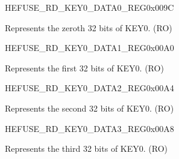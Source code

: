\begin{register}{H}{EFUSE\_RD\_KEY0\_DATA0\_REG}{0x009C}\label{regdesc:EFUSERDKEY0DATA0REG}
%
\regnewline%
\begin{regdesc}\begin{reglist}
\label{fielddesc:EFUSEKEY0DATA0}\item [EFUSE\_KEY0\_DATA0] Represents the zeroth 32 bits of KEY0. (RO)
\end{reglist}\end{regdesc}
\end{register}


\begin{register}{H}{EFUSE\_RD\_KEY0\_DATA1\_REG}{0x00A0}\label{regdesc:EFUSERDKEY0DATA1REG}
%
\regnewline%
\begin{regdesc}\begin{reglist}
\label{fielddesc:EFUSEKEY0DATA1}\item [EFUSE\_KEY0\_DATA1] Represents the first 32 bits of KEY0. (RO)
\end{reglist}\end{regdesc}
\end{register}


\begin{register}{H}{EFUSE\_RD\_KEY0\_DATA2\_REG}{0x00A4}\label{regdesc:EFUSERDKEY0DATA2REG}
%
\regnewline%
\begin{regdesc}\begin{reglist}
\label{fielddesc:EFUSEKEY0DATA2}\item [EFUSE\_KEY0\_DATA2] Represents the second 32 bits of KEY0. (RO)
\end{reglist}\end{regdesc}
\end{register}


\begin{register}{H}{EFUSE\_RD\_KEY0\_DATA3\_REG}{0x00A8}\label{regdesc:EFUSERDKEY0DATA3REG}
%
\regnewline%
\begin{regdesc}\begin{reglist}
\label{fielddesc:EFUSEKEY0DATA3}\item [EFUSE\_KEY0\_DATA3] Represents the third 32 bits of KEY0. (RO)
\end{reglist}\end{regdesc}
\end{register}


